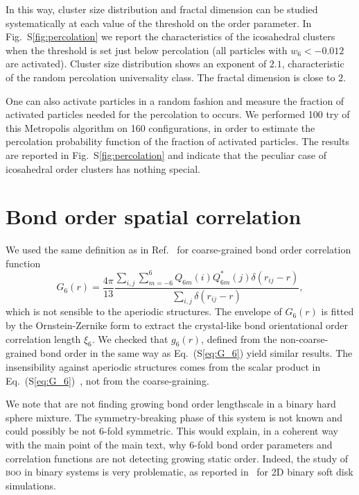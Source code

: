 \documentclass[prl,twocolumn,notitlepage]{revtex4-1}
\begin{document}
In this way, cluster size distribution and fractal dimension can be studied systematically at each value of the threshold on the order parameter. In Fig.~S\ref{fig:percolation} we report the characteristics of the icosahedral clusters when the threshold is set just below percolation (all particles with $w_6<-0.012$ are activated). Cluster size distribution shows an exponent of $2.1$, characteristic of the random percolation universality class. The fractal dimension is close to $2$.

One can also activate particles in a random fashion and measure the fraction of activated particles needed for the percolation to occurs. We performed 100 try of this Metropolis algorithm on 160 configurations, in order to estimate the percolation probability function of the fraction of activated particles. The results are reported in Fig.~S\ref{fig:percolation} and indicate that the peculiar case of icosahedral order clusters has nothing special.

\section*{Bond order spatial correlation}

We used the same definition as in Ref.~\cite{tanaka2010critical} for coarse-grained bond order correlation function
\begin{equation}
	G_6(r) = \frac{4\pi}{13}\frac{\sum_{i,j} \sum_{m=-6}^{6} Q_{6 m}(i) Q_{6 m}^{*}(j) \delta(r_{ij}-r)}{\sum_{i,j} \delta(r_{ij}-r)},
	\label{eq:G_6}
\end{equation}
which is not sensible to the aperiodic structures. The envelope of $G_6(r)$ is fitted by the Ornstein-Zernike form to extract the crystal-like bond orientational order correlation length $\xi_6$. We checked that $g_6(r)$, defined from the non-coarse-grained bond order in the same way as Eq.~(S\ref{eq:G_6}) yield similar results. The insensibility against aperiodic structures comes from the scalar product in Eq.~(S\ref{eq:G_6})~\cite{Tomida1995}, not from the coarse-graining.

We note that \citet{Charbonneau} are not finding growing bond order lengthscale in a binary hard sphere mixture. The symmetry-breaking phase of this system is not known and could possibly be not 6-fold symmetric. This would explain, in a coherent way with the main point of the main text, why 6-fold bond order parameters and correlation functions are not detecting growing static order. Indeed, the study of \textsc{boo} in binary systems is very problematic, as reported in~\citep{tanaka2010critical, KawasakiJPCM} for 2D binary soft disk simulations.
\end{document}
